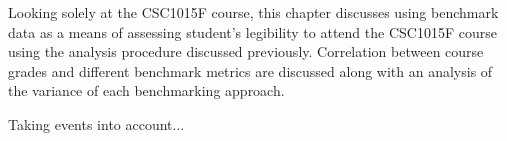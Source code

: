 Looking solely at the CSC1015F course, this chapter discusses using benchmark data as a means of assessing student's legibility to attend the CSC1015F course using the analysis procedure discussed previously. Correlation between course grades and different benchmark metrics are discussed along with an analysis of the variance of each benchmarking approach.

Taking events into account...